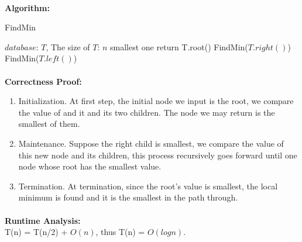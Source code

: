 \documentclass[11pt]{article}
\begin{document}
\begin{CJK*}{UTF8}{gkai}

    \paragraph{}\textbf{Algorithm:}\\
        \begin{algorithm}
        \caption{FindMin}
        \begin{algorithmic}[1]
            \Require $database$: $T$, \qquad The size of $T$: $n$
            \Ensure smallest one
                    \State return T.root()
                \Else
                        \State FindMin($T.right()$)
                    \Else
                        \State FindMin($T.left()$)
                    \EndIf
                \EndIf
            \EndFunction
            \State
        \end{algorithmic}
    \end{algorithm}


\paragraph{}\textbf{Correctness Proof:}

\begin{enumerate}[ 1]
    \item  Initialization. At first step, the initial node we input is the root, we compare the value of and it and its two children. The node we may return is the smallest of them.

    \item  Maintenance. Suppose the right child is smallest, we compare the value of this new node and its children, this process recursively goes forward until one node whose root has the smallest value.
    \item  Termination. At termination, since the root's value is smallest, the local minimum is found and it is the smallest in the path through.
\end{enumerate}


\paragraph{}\textbf{Runtime Analysis:} \\
 T(n) = T(n/2) + $O(n)$, thus T(n) = $O(logn)$.




\end{CJK*}
\end{document}
